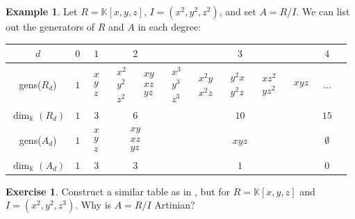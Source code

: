 \documentclass[12pt,a4paper]{article}
\newcommand{\KK}{\mathbb{K}}
\theoremstyle{definition}
\newtheorem{example}[theorem]{Example}
\newtheorem{exercise}[theorem]{Exercise}
\numberwithin{equation}{section}
\begin{document}
\begin{example}
    \label{example:artinian-algebra}
    Let $R = \KK[x,y,z]$, $I = (x^2, y^2, z^2)$, and set $A = R/I$.
    We can list out the generators of $R$ and $A$ in each degree:
    
    \begin{center}
    {\renewcommand{\arraystretch}{2.5}
    \begin{tabular}{|c||c|c|c|c|c|c|}
        \hline
        $d$ & $0$ & $1$ & $2$ & $3$ & $4$ \\
        \hline
        \hline
        gens($R_d$) & $1$ & $\substack{x \\ y \\ z}$ & $\substack{x^2 \\ y^2 \\ z^2} \quad \substack{xy \\ xz \\ yz}$ & $\substack{x^3 \\ y^3 \\ z^3} \quad \substack{x^2 y \\ x^2 z} \quad \substack{y^2 x \\ y^2 z} \quad \substack{x z^2 \\ y z^2} \quad \substack{xyz}$ & $\dots$ \\
        \hline
        $\dim_\KK(R_d)$ & $1$ & $3$ & $6$ & $10$ & $15$ \\
        \hline
        \hline
        gens($A_d$) & $1$ & $\substack{x \\ y \\ z}$ & $\substack{xy \\ xz \\ yz}$ & $xyz$ & $\emptyset$ \\
        \hline
        $\dim_\KK(A_d)$ & $1$ & $3$ & $3$ & $1$ & $0$ \\
        \hline
    \end{tabular}
    }
    \end{center}
\end{example}

\begin{exercise}
    Construct a similar table as in , but for $R = \KK[x,y,z]$ and $I = (x^2, y^2, z^3)$.
    Why is $A = R/I$ Artinian?
\end{exercise}
\end{document}
